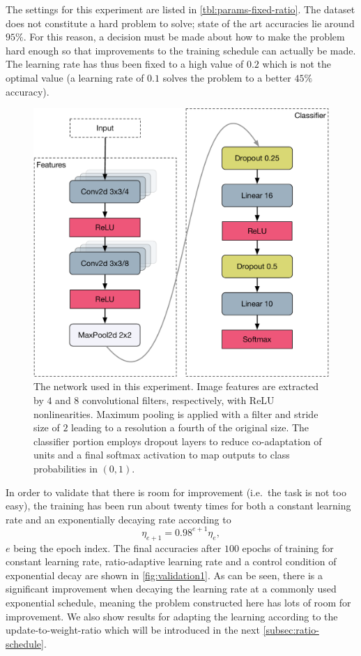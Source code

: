 The settings for this experiment are listed in \cref{tbl:params-fixed-ratio}. The
dataset does not constitute a hard problem to solve; state of the art accuracies
lie around $95\%$. For this reason, a decision must be made about how to make
the problem hard enough so that improvements to the training schedule can
actually be made. The learning rate has thus been fixed to a high value of $0.2$
which is not the optimal value (a learning rate of $0.1$ solves the problem to
a better $45\%$ accuracy).

\begin{figure}
    \centering
    \includegraphics[width=\linewidth]{gfx/diagrams/neural_network/alexnetmini.pdf}
    \caption[Simplified AlexNet architecture]{The network used in this
    experiment. Image features are extracted by $4$ and $8$ convolutional
    filters, respectively, with ReLU nonlinearities. Maximum pooling is applied
    with a filter and stride size of $2$ leading to a resolution a fourth of the
    original size. The classifier portion employs dropout layers to reduce
    co-adaptation of units and a final softmax activation to map outputs to
    class probabilities in $(0,1)$.}
    \label{fig:alexnetmini}
\end{figure}

In order to validate that there is room for improvement (i.e.~the task is not
too easy), the training has been
run about twenty times for both a constant learning rate and an exponentially
decaying rate according to
\begin{equation}
    \eta_{e+1}  = 0.98^{e+1} \eta_{e},
\end{equation}
$e$ being the epoch index.  The final accuracies after $100$ epochs of training
for constant learning rate, ratio-adaptive learning rate and a control condition
of exponential decay are shown in \cref{fig:validation1}. As can be seen, there
is a significant improvement when decaying the learning rate at a commonly used
exponential schedule, meaning the problem constructed here has lots of room for
improvement. We also show results for adapting the learning according to the
update-to-weight-ratio which will be introduced in the next \cref{subsec:ratio-schedule}.


